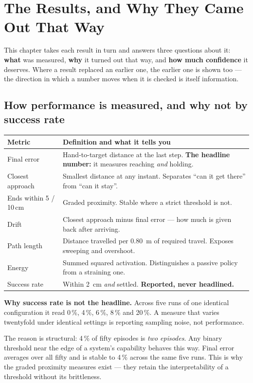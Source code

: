 \chapter{The Results, and Why They Came Out That Way}
\label{ch:results}

This chapter takes each result in turn and answers three questions about it:
\textbf{what} was measured, \textbf{why} it turned out that way, and \textbf{how
much confidence} it deserves. Where a result replaced an earlier one, the earlier
one is shown too --- the direction in which a number moves when it is checked is
itself information.

\section{How performance is measured, and why not by success rate}

\begin{center}
\begin{tabular}{@{} L{4.0cm} L{10.0cm} @{}}
\toprule
\textbf{Metric} & \textbf{Definition and what it tells you} \\
\midrule
Final error & Hand-to-target distance at the last step. \textbf{The headline number:} it measures reaching \emph{and} holding. \\
Closest approach & Smallest distance at any instant. Separates ``can it get there'' from ``can it stay''. \\
Ends within 5 / 10\,cm & Graded proximity. Stable where a strict threshold is not. \\
Drift & Closest approach minus final error --- how much is given back after arriving. \\
Path length & Distance travelled per \SI{0.80}{\meter} of required travel. Exposes sweeping and overshoot. \\
Energy & Summed squared activation. Distinguishes a passive policy from a straining one. \\
Success rate & Within \SI{2}{\centi\meter} \emph{and} settled. \textbf{Reported, never headlined.} \\
\bottomrule
\end{tabular}
\end{center}

\begin{why}
\textbf{Why success rate is not the headline.} Across five runs of one identical
configuration it read 0\,\%, 4\,\%, 6\,\%, 8\,\% and 20\,\%. A measure that
varies twentyfold under identical settings is reporting sampling noise, not
performance.

The reason is structural: 4\,\% of fifty episodes is \emph{two episodes}. Any
binary threshold near the edge of a system's capability behaves this way. Final
error averages over all fifty and is stable to 4\,\% across the same five runs.
This is why the graded proximity measures exist --- they retain the
interpretability of a threshold without its brittleness.
\end{why}

